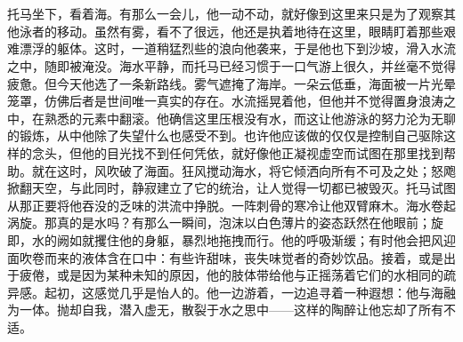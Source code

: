 \chapter{}

托马坐下，看着海。有那么一会儿，他一动不动，就好像到这里来只是为了观察其他泳者的移动。虽然有雾，看不了很远，他还是执着地待在这里，眼睛盯着那些艰难漂浮的躯体。这时，一道稍猛烈些的浪向他袭来，于是他也下到沙坡，滑入水流之中，随即被淹没。海水平静，而托马已经习惯于一口气游上很久，并丝毫不觉得疲惫。但今天他选了一条新路线。雾气遮掩了海岸。一朵云低垂，海面被一片光晕笼罩，仿佛后者是世间唯一真实的存在。水流摇晃着他，但他并不觉得置身浪涛之中，在熟悉的元素中翻滚。他确信这里压根没有水，而这让他游泳的努力沦为无聊的锻炼，从中他除了失望什么也感受不到。也许他应该做的仅仅是控制自己驱除这样的念头，但他的目光找不到任何凭依，就好像他正凝视虚空而试图在那里找到帮助。就在这时，风吹破了海面。狂风搅动海水，将它倾洒向所有不可及之处；怒飑掀翻天空，与此同时，静寂建立了它的统治，让人觉得一切都已被毁灭。托马试图从那正要将他吞没的乏味的洪流中挣脱。一阵刺骨的寒冷让他双臂麻木。海水卷起涡旋。那真的是水吗？有那么一瞬间，泡沫以白色薄片的姿态跃然在他眼前；旋即，水的阙如就攫住他的身躯，暴烈地拖拽而行。他的呼吸渐缓；有时他会把风迎面吹卷而来的液体含在口中：有些许甜味，丧失味觉者的奇妙饮品。接着，或是出于疲倦，或是因为某种未知的原因，他的肢体带给他与正摇荡着它们的水相同的疏异感。起初，这感觉几乎是怡人的。他一边游着，一边追寻着一种遐想：他与海融为一体。抛却自我，潜入虚无，散裂于水之思中——这样的陶醉让他忘却了所有不适。
